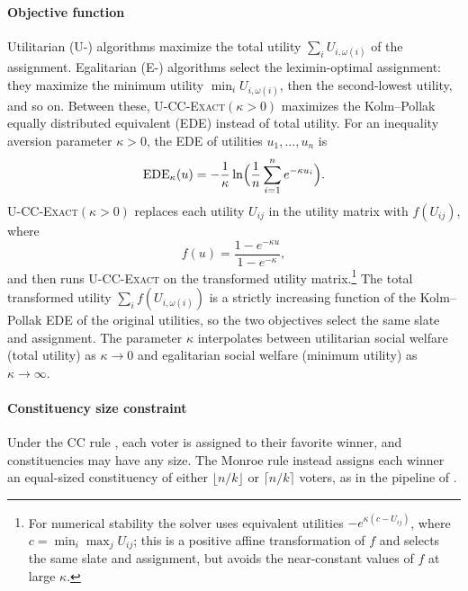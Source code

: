 \documentclass[letterpaper]{article} %
\newcommand{\Exact}{\textsc{U-CC-Exact}}
\newcommand{\ExactP}{\textsc{U-CC-Exact}$(\kappa>0)$}
\begin{document}
\paragraph{Objective function}
Utilitarian (U-) algorithms maximize the total utility \(\sum_i U_{i,\omega(i)}\) of the assignment.
Egalitarian (E-) algorithms select the leximin-optimal assignment: they maximize the minimum utility \(\min_i U_{i,\omega(i)}\), then the second-lowest utility, and so on.
Between these, \ExactP{} maximizes the Kolm--Pollak equally distributed equivalent (EDE) \citep{pollak-1971, kolm-1976} instead of total utility.
For an inequality aversion parameter \(\kappa>0\), the EDE of utilities \(u_1,\dots,u_n\) is
\[
\mathrm{EDE}_\kappa(u)=-\frac{1}{\kappa}\ln\Bigl(\frac{1}{n}\sum_{i=1}^n e^{-\kappa u_i}\Bigr).
\]
\ExactP{} replaces each utility \(U_{ij}\) in the utility matrix with \(f(U_{ij})\), where
\[
f(u)=\frac{1-e^{-\kappa u}}{1-e^{-\kappa}},
\]
and then runs \Exact{} on the transformed utility matrix.\footnote{For numerical stability the solver uses equivalent utilities \(-e^{\kappa(c-U_{ij})}\), where \(c=\min_i\max_j U_{ij}\); this is a positive affine transformation of \(f\) and selects the same slate and assignment, but avoids the near-constant values of \(f\) at large \(\kappa\).}
The total transformed utility \(\sum_i f(U_{i,\omega(i)})\) is a strictly increasing function of the Kolm--Pollak EDE of the original utilities, so the two objectives select the same slate and assignment.
The parameter \(\kappa\) interpolates between utilitarian social welfare (total utility) as \(\kappa\to0\) and egalitarian social welfare (minimum utility) as \(\kappa\to\infty\).

\paragraph{Constituency size constraint}
Under the CC rule \citep{chamberlin-courant}, each voter is assigned to their favorite winner, and constituencies may have any size.
The Monroe rule \citep{monroe-1995} instead assigns each winner an equal-sized constituency of either \(\lfloor n/k\rfloor\) or \(\lceil n/k\rceil\) voters, as in the pipeline of \citet{fish-v2}.
\end{document}
